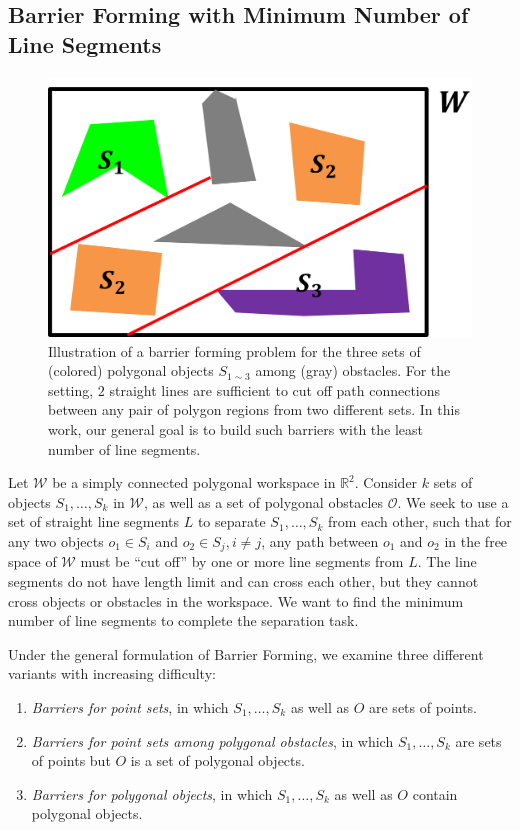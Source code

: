 \subsection{Barrier Forming with Minimum Number of Line Segments}

\begin{figure}[ht]
    \centering
    \vspace{.05in}
    \includegraphics[width = .35\textwidth]{chapters/bf/fig/formulation_pic.png}
    \vspace{.05in}
    \caption{Illustration of a barrier forming problem for the three sets of (colored) polygonal objects $S_{1\sim3}$ among (gray) obstacles. 
    For the setting, $2$ straight lines are sufficient to cut off path connections between any pair of polygon regions from two different sets. 
    In this work, our general goal is to build such barriers with the least number of line segments.}
    \label{fig:bf-illustration}
\end{figure}

Let $\mathcal{W}$ be a simply connected polygonal workspace in $\mathbb R^2$. Consider $k$ sets of objects $S_1, \dots, S_k$ in $\mathcal W$, as well as a set of polygonal obstacles $\mathcal O$. 
We seek to use a set of straight line segments $L$ to separate $S_1, \dots, S_k$ from each other, such that for any two objects $o_1 \in S_i$ and $o_2 \in S_j, i \ne j$, any path between $o_1$ and $o_2$ in the free space of $\mathcal W$ must be ``cut off'' by one or more line segments from $L$. 
The line segments do not have length limit and can cross each other, but they cannot cross objects or obstacles in the workspace. We want to find the minimum number of line segments to complete the separation task. 

Under the general formulation of Barrier Forming, we examine three different variants with increasing difficulty:
\begin{enumerate} 
\item \emph{Barriers for point sets}, in which  $S_1, \dots, S_k$ as well as $O$ are sets of points. 
\item \emph{Barriers for point sets among polygonal obstacles}, in which  $S_1, \dots, S_k$ are sets of points but $O$ is a set of polygonal objects. 
\item \emph{Barriers for polygonal objects}, in which $S_1, \dots, S_k$ as well as $O$ contain polygonal objects. 
\end{enumerate}

